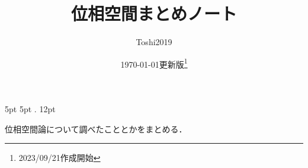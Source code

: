     {5pt}%
    {5pt}%
    {}%
    {}%
    {\bfseries}%
    {.}%
    {12pt}%
    {}%

\theoremstyle{mystyle}
\newtheorem{AXM}{公理}[section]
\newtheorem{DFN}[Axiom]{定義}
\newtheorem{THM}[Axiom]{定理}
\newtheorem*{THM*}{定理}
\newtheorem{PRP}[Axiom]{命題}
\newtheorem{LMM}[Axiom]{補題}
\newtheorem{CRL}[Axiom]{系}
\newtheorem{EG}[Axiom]{例}
\newtheorem{CNV}[Axiom]{規約}





\def\inner<#1>{\langle #1 \rangle}

\def\ind<#1>{\mathop{\text{``}\hspace{-0.7pt}#1\limits\hspace{-1.5pt}\text{''}}}







\title{位相空間まとめノート}
\author{Toshi2019}
\date{\today 更新版\footnote{2023/09/21作成開始}}

\maketitle

位相空間論について調べたこととかをまとめる．
\tableofcontents


